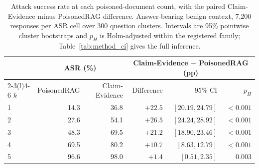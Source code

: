 \begin{table}[t]\centering
\caption{Attack success rate at each poisoned-document count, with the paired Claim-Evidence minus PoisonedRAG difference. Answer-bearing benign context, 7{,}200 responses per ASR cell over 300 question clusters. Intervals are 95\% pointwise cluster bootstraps and $p_H$ is Holm-adjusted within the registered family; Table~\ref{tab:method_ci} gives the full inference.}
\label{tab:count_ladder}
\small
\begin{tabular}{@{}lrrrrr@{}}
\toprule
 & \multicolumn{2}{c}{ASR (\%)} & \multicolumn{3}{c}{Claim-Evidence $-$ PoisonedRAG (pp)} \\
\cmidrule(lr){2-3}\cmidrule(l){4-6}
$k$ & PoisonedRAG & Claim-Evidence & Difference & 95\% CI & $p_H$ \\
\midrule
1 & 14.3 & 36.8 & $+22.5$ & $[20.19, 24.79]$ & $<0.001$ \\
2 & 27.6 & 54.1 & $+26.5$ & $[24.24, 28.92]$ & $<0.001$ \\
3 & 48.3 & 69.5 & $+21.2$ & $[18.90, 23.46]$ & $<0.001$ \\
4 & 69.5 & 80.2 & $+10.7$ & $[8.63, 12.79]$ & $<0.001$ \\
5 & 96.6 & 98.0 & $+1.4$ & $[0.51, 2.35]$ & 0.003 \\
\bottomrule
\end{tabular}
\end{table}
